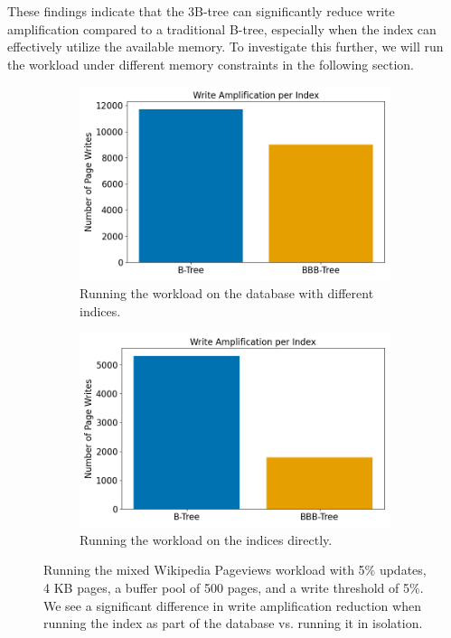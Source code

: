 These findings indicate that the 3B-tree can significantly reduce write amplification compared to a traditional B-tree, especially when the index can effectively utilize the available memory.
To investigate this further, we will run the workload under different memory constraints in the following section.

\begin{figure}[htbp]
  \centering
  \begin{subfigure}[b]{0.49\textwidth}
    \centering
    \includegraphics[width=\textwidth]{figures/evaluation/pageviews_mixed_db.png}
    \caption{Running the workload on the database with different indices.}
    \label{fig:sub1}
  \end{subfigure}
  \hfill
  \begin{subfigure}[b]{0.49\textwidth}
    \centering
    \includegraphics[width=\textwidth]{figures/evaluation/pageviews_mixed_index.png}
    \caption{Running the workload on the indices directly.}
    \label{fig:sub2}
  \end{subfigure}
  \caption{Running the mixed Wikipedia Pageviews workload with 5\% updates, 4 KB pages, a buffer pool of 500 pages, and a write threshold of 5\%. We see a significant difference in write amplification reduction when running the index as part of the database vs. running it in isolation.}
  \label{fig:both}
\end{figure}

